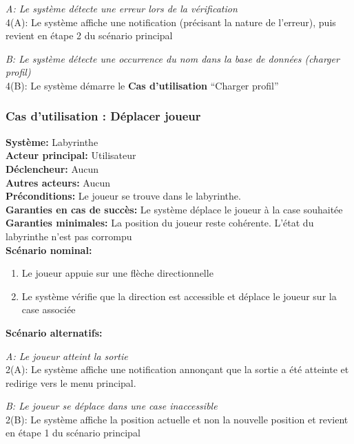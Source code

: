 \documentclass{butexFR}
\begin{document}
\emph{A: Le système détecte une erreur lors de la vérification}\\
\hspace*{1em}4(A): Le système affiche une notification (précisant la nature de l'erreur), puis revient en étape 2 du scénario principal

\emph{B: Le système détecte une occurrence du nom dans la base de données (charger profil)}\\
\hspace*{1em}4(B): Le système démarre le \textbf{Cas d'utilisation} ``Charger profil''

\newpage

\subsubsection{Cas d'utilisation : Déplacer joueur}
\textbf{Système:} Labyrinthe\\
\textbf{Acteur principal:} Utilisateur\\
\textbf{Déclencheur:} Aucun\\
\textbf{Autres acteurs:} Aucun\\[0.25em]
\textbf{Préconditions:} Le joueur se trouve dans le labyrinthe.\\
\textbf{Garanties en cas de succès:} Le système déplace le joueur à la case souhaitée\\
\textbf{Garanties minimales:} La position du joueur reste cohérente. L'état du labyrinthe n'est pas corrompu \\[0.25em]
\textbf{Scénario nominal:}
\begin{enumerate}
    \item Le joueur appuie sur une flèche directionnelle
    \item Le système vérifie que la direction est accessible et déplace le joueur sur la case associée
\end{enumerate}
\textbf{Scénario alternatifs:}

\emph{A: Le joueur atteint la sortie}\\
\hspace*{1em}2(A): Le système affiche une notification annonçant que la sortie a été atteinte et redirige vers le menu principal.

\emph{B: Le joueur se déplace dans une case inaccessible}\\
\hspace*{1em}2(B): Le système affiche la position actuelle et non la nouvelle position et revient en étape 1 du scénario principal
\end{document}
